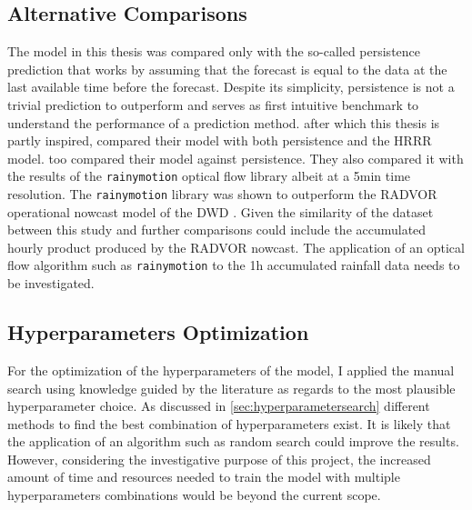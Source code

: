 \subsection{Alternative Comparisons}
The model in this thesis was compared only with the so-called persistence prediction that works by assuming that the forecast is equal to the data at the last available time before the forecast. Despite its simplicity, persistence is not a trivial prediction to outperform and serves as first intuitive benchmark to understand the performance of a prediction method. \citet{Agrawal2019MachineImages} after which this thesis is partly inspired, compared their model with both persistence and the HRRR model. \citet{Ayzel2020RainNetNowcasting} too compared their model against persistence. They also compared it with the results of the \verb|rainymotion| \citep{Ayzel2019OpticalV0.1} optical flow library albeit at a 5min time resolution. The \verb|rainymotion| library was shown to outperform the RADVOR \citep{DeutscherWetterdienst2022RADVORRadar-Niederschlagsvorhersage} operational nowcast model of the DWD \citep{Ayzel2019OpticalV0.1}. Given the similarity of the dataset between this study and \citet{Ayzel2020RainNetNowcasting} further comparisons could include the accumulated hourly product produced by the RADVOR nowcast. The application of an optical flow algorithm such as \verb|rainymotion| to the 1h accumulated rainfall data needs to be investigated.

\subsection{Hyperparameters Optimization}
For the optimization of the hyperparameters of the model, I applied the manual search using knowledge guided by the literature as regards to the most plausible hyperparameter choice. As discussed in \cref{sec:hyperparametersearch} different methods to find the best combination of hyperparameters exist. It is likely that the application of an algorithm such as random search \cite{Bergstra2012RandomOptimization} could improve the results. However, considering the investigative purpose of this project, the increased amount of time and resources needed to train the model with multiple hyperparameters combinations would be beyond the current scope.

